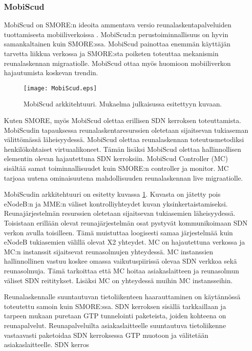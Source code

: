 \subsubsection{MobiScud} \label{mobiscud}
MobiScud on SMORE:n ideoita ammentava versio reunalaskentapalveluiden tuottamisesta mobiiliverkoissa \cite{wang2015mobiscud}.
MobiScud:n perustoiminnallisuus on hyvin samankaltainen kuin SMORE:ssa. MobiScud painottaa enemmän käyttäjän tarvetta liikkua verkossa ja SMORE:sta poiketen toteuttaa mekanismin reunalaskennan migraatiolle. 
MobiScud ottaa myös huomioon mobiiliverkon hajautumista koskevan trendin.

\begin{figure}[tb]
\texttt{[image: MobiScud.eps]}
\caption{MobiScud arkkitehtuuri. Mukaelma julkaisussa \cite{wang2015mobiscud}  esitettyyn kuvaan.} \label{fig:mobiscud}
\end{figure}

Kuten SMORE, myös MobiScud olettaa erillisen SDN kerroksen toteuttamista. MobiScudin tapauksessa reunalaskentaresurssien oletetaan sijaitsevan tukiaseman välittömässä läheisyydessä. 
MobiScud olettaa reunalaskennan toteutusmetodiksi henkilökohtaiset virtuaalikoneet.
Tämän lisäksi MobiScud olettaa hallinnollisen elementin olevan hajautettuna SDN kerroksiin. MobiScud Controller (MC) sisältää samat toiminnallisuudet kuin SMORE:n controller ja monitor. 
MC tarjoaa uutena ominaisuutena mahdollisuuden reunalaskennan live migraatiolle.

MobiScudin arkkitehtuuri on esitetty kuvassa \ref{fig:mobiscud}. Kuvasta on jätetty pois eNodeB:n ja MME:n väliset kontrolliyhteydet kuvan yksinkertaistamiseksi.
Reunajärjestelmän resurssien oletetaan sijaitsevan tukiasemien läheisyydessä.
Toisistaan erillään olevat reunajärjestelmän osat pystyvät kommunikoimaan SDN verkon avulla toisilleen.
Tämä muistuttaa loogisesti samaa järjestelmää kuin eNodeB tukiasemien välillä olevat X2 yhteydet.
MC on hajautettuna verkossa ja MC:n instanssit sijaitsevat reunasolmujen yhteydessä.
MC instanssien hallinnollinen vastuu koskee omassa vaikutuspiirissä olevaa SDN verkkoa sekä reunasolmuja. Tämä tarkoittaa että MC hoitaa asiakaslaitteen ja reunasolmun väliset SDN reititykset. Lisäksi MC on yhteydessä muihin MC instansseihin.

Reunalaskennalle suuntautuvan tietoliikenteen haarauttaminen on käytännössä toteutettu samoin kuin SMORE:ssa.
SDN kerroksen sisällä tarkkaillaan ja tarpeen mukaan puretaan GTP tunnelointi paketeista, joiden kohteena on reunapalvelut. Reunapalveluilta asiakaslaitteelle suuntautuva tietoliikenne vastaavasti paketoidaa SDN kerroksessa GTP muotoon ja välitetään asiakaslaitteelle.
SDN kerros

